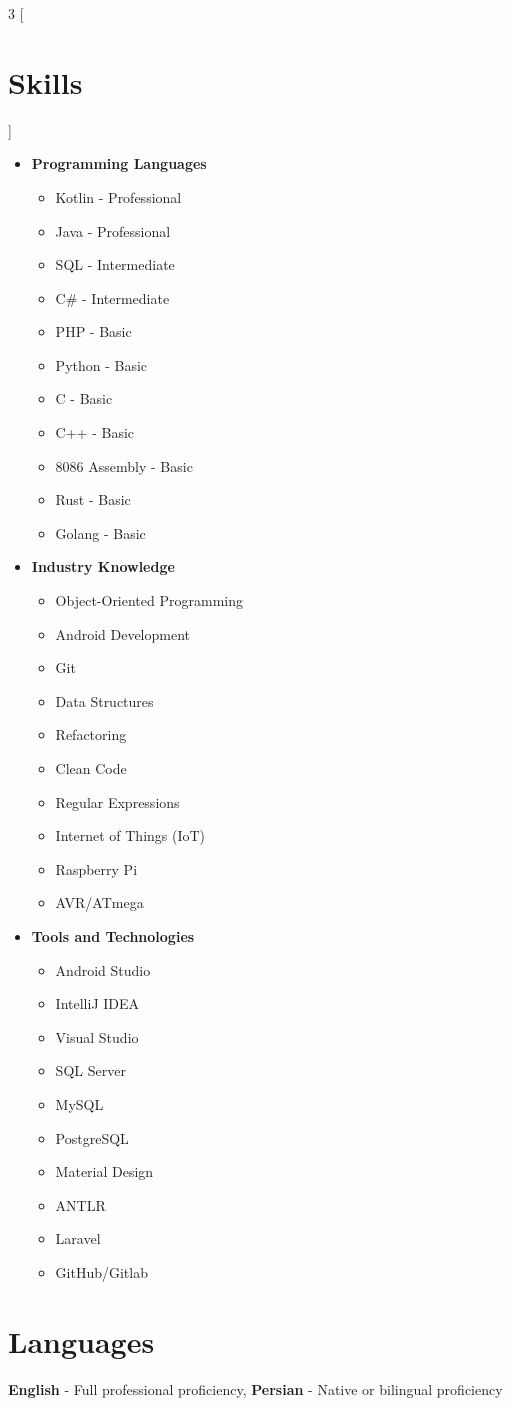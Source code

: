 \begin{multicols}{3}
[\section*{\LARGE{Skills}}]
    \begin{itemize}
        \item \textbf{Programming Languages}
        \begin{itemize}
            \item Kotlin - Professional
            \item Java - Professional
            \item SQL - Intermediate
            \item C\# - Intermediate
            \item PHP - Basic
            \item Python - Basic
            \item C - Basic
            \item C++ - Basic
            \item 8086 Assembly - Basic
            \item Rust - Basic
            \item Golang - Basic
        \end{itemize}
        \item \textbf{Industry Knowledge}
        \begin{itemize}
            \item Object-Oriented Programming
            \item Android Development
            \item Git
            \item Data Structures
            \item Refactoring
            \item Clean Code
            \item Regular Expressions
            \item Internet of Things (IoT)
            \item Raspberry Pi
            \item AVR/ATmega
        \end{itemize}
        \item \textbf{Tools and Technologies}
        \begin{itemize}
            \item Android Studio
            \item IntelliJ IDEA
            \item Visual Studio
            \item SQL Server
            \item MySQL
            \item PostgreSQL
            \item Material Design
            \item ANTLR
            \item Laravel
            \item GitHub/Gitlab
        \end{itemize}
    \end{itemize}
\end{multicols}

\section*{Languages}
\textbf{English} - Full professional proficiency, \qquad\qquad\qquad \textbf{Persian} - Native or bilingual proficiency